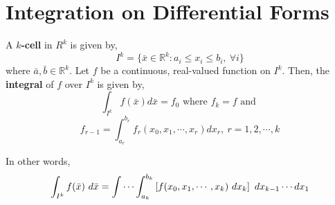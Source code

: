 \section{Integration on Differential Forms}
\begin{definition}
	A \textbf{$k$-cell} in $R^k$ is given by, 
	\[ I^k = \{ \bar{x} \in \mathbb{R}^k : a_i \le x_i \le b_i,\ \forall i \} \]
	where $\bar{a},\bar{b} \in \mathbb{R}^k$.
	Let $f$ be a continuous, real-valued function on $I^k$.
	Then, the \textbf{integral} of $f$ over $I^k$ is given by,
	\[ \int_{I^k}f(\bar{x}) d\bar{x} = f_0 \text{ where } f_k = f \text{ and } \]
	\[ f_{r-1} = \int_{a_r}^{b_r} f_r(x_0,x_1,\cdots,x_r) dx_r,\ r = 1,2,\cdots,k \]
\begin{commentary}
	In other words,
	\[ \int_{I^k} f(\bar{x})\ d\bar{x} = \idotsint_{a_k}^{b_k} \left[f(x_0,x_1,\cdots,x_k)\ dx_k\right]\ dx_{k-1}\cdots dx_1 \]
\end{commentary}
\end{definition}

